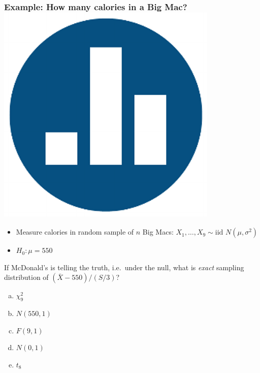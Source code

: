 %
%
\begin{frame}[t]
	\frametitle{Example: How many calories in a Big Mac? \hfill \includegraphics[scale = 0.05]{./images/clicker}}
\begin{itemize}
	\item Measure calories in random sample of $n$ Big Macs: $X_1, \hdots, X_9 \sim \mbox{iid } N (\mu, \sigma^2)$
	\item $H_0\colon \mu = 550$
\end{itemize}

\vspace{1em}

\alert{If McDonald's is telling the truth, i.e.\ under the null, what is \emph{exact}  sampling distribution of $(\bar{X} - 550)/(S/3)$?}
\begin{enumerate}[(a)]
	\item $\chi^2_{9}$
	\item $N(550, 1)$
	\item $F(9, 1)$
	\item $N(0,1)$ 
	\item $t_{8}$
\end{enumerate}
\end{frame}
